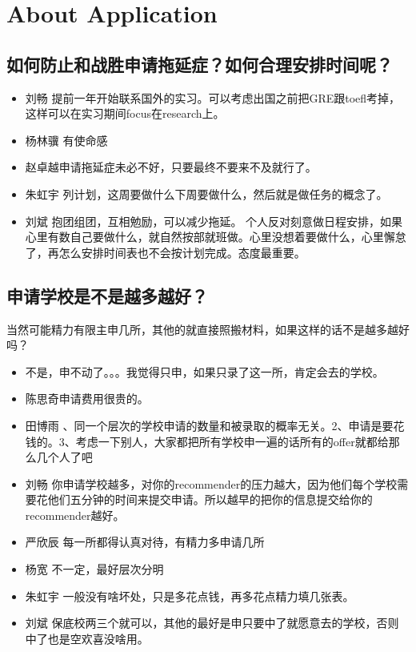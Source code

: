 \documentclass{vivid_layout}
\begin{document}
\section{About Application}
\addtocounter{section}{1}
\setcounter{subsection}{0}

\subsection{如何防止和战胜申请拖延症？如何合理安排时间呢？}
\begin{itemize}
\item  { 刘畅}  \quad 提前一年开始联系国外的实习。可以考虑出国之前把GRE跟toefl考掉，这样可以在实习期间focus在research上。
\item  { 杨林骥}  \quad 有使命感
\item  { 赵卓越}申请拖延症未必不好，只要最终不要来不及就行了。
\item  { 朱虹宇}  \quad 列计划，这周要做什么下周要做什么，然后就是做任务的概念了。
\item  { 刘斌}  \quad 抱团组团，互相勉励，可以减少拖延。
    个人反对刻意做日程安排，如果心里有数自己要做什么，就自然按部就班做。心里没想着要做什么，心里懈怠了，再怎么安排时间表也不会按计划完成。态度最重要。
\end{itemize}

\subsection{ 申请学校是不是越多越好？}
当然可能精力有限主申几所，其他的就直接照搬材料，如果这样的话不是越多越好吗？
\begin{itemize}
\item 不是，申不动了。。。我觉得只申，如果只录了这一所，肯定会去的学校。
\item { 陈思奇}\quad 申请费用很贵的。
\item  { 田博雨}  、同一个层次的学校申请的数量和被录取的概率无关。2、申请是要花钱的。3、考虑一下别人，大家都把所有学校申一遍的话所有的offer就都给那么几个人了吧
\item  { 刘畅}  \quad 你申请学校越多，对你的recommender的压力越大，因为他们每个学校需要花他们五分钟的时间来提交申请。所以越早的把你的信息提交给你的recommender越好。
\item  { 严欣辰}  \quad 每一所都得认真对待，有精力多申请几所
\item  { 杨宽}  \quad 不一定，最好层次分明
\item  { 朱虹宇}  \quad 一般没有啥坏处，只是多花点钱，再多花点精力填几张表。
\item  { 刘斌}  \quad 保底校两三个就可以，其他的最好是申只要中了就愿意去的学校，否则中了也是空欢喜没啥用。
\end{itemize}
\end{document}
